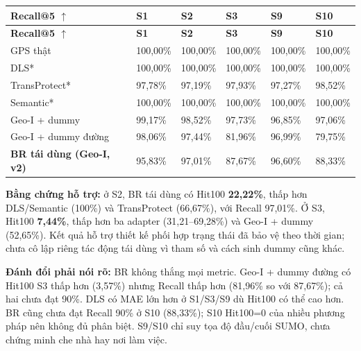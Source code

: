 \begingroup\small
\begin{longtable}{@{}P{3.364cm}P{2.486cm}P{2.486cm}P{2.486cm}P{2.486cm}P{2.486cm}@{}}
\toprule
\textbf{Recall@5 $\uparrow$} & \textbf{S1} & \textbf{S2} & \textbf{S3} & \textbf{S9} & \textbf{S10}\\\midrule
\endfirsthead
\toprule
\textbf{Recall@5 $\uparrow$} & \textbf{S1} & \textbf{S2} & \textbf{S3} & \textbf{S9} & \textbf{S10}\\\midrule
\endhead
\bottomrule\endfoot
GPS thật & 100,00\% & 100,00\% & 100,00\% & 100,00\% & 100,00\%\\
\addlinespace[3pt]
DLS* & 100,00\% & 100,00\% & 100,00\% & 100,00\% & 100,00\%\\
\addlinespace[3pt]
TransProtect* & 97,78\% & 97,19\% & 97,93\% & 97,27\% & 98,52\%\\
\addlinespace[3pt]
Semantic* & 100,00\% & 100,00\% & 100,00\% & 100,00\% & 100,00\%\\
\addlinespace[3pt]
Geo-I + dummy & 99,17\% & 98,52\% & 97,73\% & 96,85\% & 97,06\%\\
\addlinespace[3pt]
Geo-I + dummy đường & 98,06\% & 97,44\% & 81,96\% & 96,99\% & 79,75\%\\
\addlinespace[3pt]
\textbf{BR tái dùng (Geo-I, v2)} & 95,83\% & 97,01\% & 87,67\% & 96,60\% & 88,33\%\\
\end{longtable}
\endgroup
\textbf{Bằng chứng hỗ trợ:} ở S2, BR tái dùng có Hit100 \textbf{22,22\%}, thấp hơn DLS/Semantic (100\%) và TransProtect (66,67\%), với Recall 97,01\%. Ở S3, Hit100 \textbf{7,44\%}, thấp hơn ba adapter (31,21–69,28\%) và Geo-I + dummy (52,65\%). Kết quả hỗ trợ thiết kế phối hợp trạng thái đã bảo vệ theo thời gian; chưa cô lập riêng tác động tái dùng vì tham số và cách sinh dummy cũng khác.

\textbf{Đánh đổi phải nói rõ:} BR không thắng mọi metric. Geo-I + dummy đường có Hit100 S3 thấp hơn (3,57\%) nhưng Recall thấp hơn (81,96\% so với 87,67\%); cả hai chưa đạt 90\%. DLS có MAE lớn hơn ở S1/S3/S9 dù Hit100 có thể cao hơn. BR cũng chưa đạt Recall 90\% ở S10 (88,33\%); S10 Hit100=0 của nhiều phương pháp nên không đủ phân biệt. S9/S10 chỉ suy tọa độ đầu/cuối SUMO, chưa chứng minh che nhà hay nơi làm việc.



